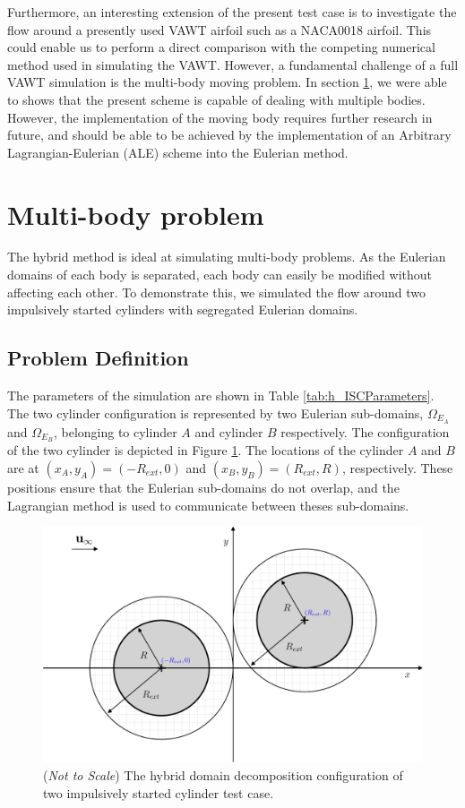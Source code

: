 Furthermore, an interesting extension of the present test case is to investigate the flow around a presently used VAWT airfoil such as a NACA0018 airfoil. This could enable us to perform a direct comparison with the competing numerical method used in simulating the VAWT. However, a fundamental challenge of a full VAWT simulation is the multi-body moving problem. In section \ref{sec:vvhm-mb}, we were able to shows that the present scheme is capable of dealing with multiple bodies. However, the implementation of the moving body requires further research in future, and should be able to be achieved by the implementation of an Arbitrary Lagrangian-Eulerian (ALE) scheme into the Eulerian method.

\newpage
	
\section{Multi-body problem}
\label{sec:vvhm-mb}

The hybrid method is ideal at simulating multi-body problems. As the Eulerian domains of each body is separated, each body can easily be modified without affecting each other. To demonstrate this, we simulated the flow around two impulsively started cylinders with segregated Eulerian domains. 

\subsection{Problem Definition}

The parameters of the simulation are shown in Table \ref{tab:h_ISCParameters}. The two cylinder configuration is represented by two Eulerian sub-domains, $\Omega_{E_{A}}$ and $\Omega_{E_B}$, belonging to cylinder $A$ and cylinder $B$ respectively. The configuration of the two cylinder is depicted in Figure \ref{fig:hmisc_dd-crop}. The locations of the cylinder $A$ and $B$ are at $(x_A,y_A) = (-R_{ext},0)$ and $(x_B,y_B) = (R_{ext},R)$, respectively. These positions ensure that the Eulerian sub-domains do not overlap, and the Lagrangian method is used to communicate between theses sub-domains.

	\begin{figure}[!h]
	\centering
	\includegraphics[width=0.6\linewidth]{./figures/validation/multipleCylinder/hmisc_dd-crop.pdf}
	\caption{(\textit{Not to Scale}) The hybrid domain decomposition configuration of two impulsively started cylinder test case. }
	\label{fig:hmisc_dd-crop}
	\end{figure}

